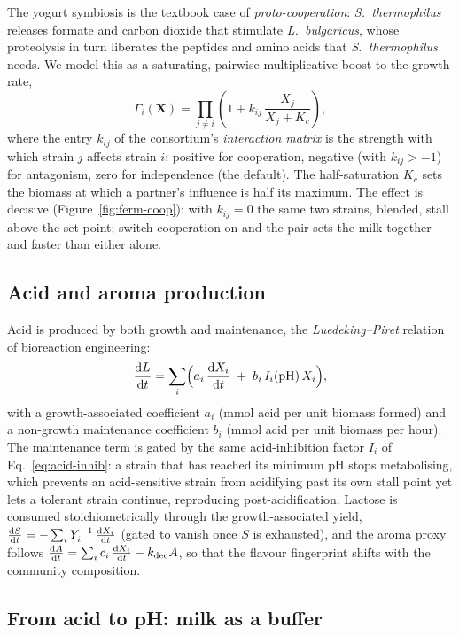 The yogurt symbiosis is the textbook case of \emph{proto-cooperation}: \emph{S.\
thermophilus} releases formate and carbon dioxide that stimulate \emph{L.\
bulgaricus}, whose proteolysis in turn liberates the peptides and amino acids that
\emph{S.\ thermophilus} needs. We model this as a saturating, pairwise
multiplicative boost to the growth rate,
%
\begin{equation}
\Gamma_i(\bm X) = \prod_{j\neq i}
\left(1 + k_{ij}\,\frac{X_j}{X_j+K_c}\right),
\label{eq:interaction}
\end{equation}
%
where the entry $k_{ij}$ of the consortium's \emph{interaction matrix} is the
strength with which strain $j$ affects strain $i$: positive for cooperation,
negative (with $k_{ij}>-1$) for antagonism, zero for independence (the default).
The half-saturation $K_c$ sets the biomass at which a partner's influence is half
its maximum. The effect is decisive (Figure~\ref{fig:ferm-coop}): with
$k_{ij}=0$ the same two strains, blended, stall above the set point; switch
cooperation on and the pair sets the milk together and faster than either alone.

\subsection{Acid and aroma production}

Acid is produced by both growth and maintenance, the \emph{Luedeking--Piret}
relation~\cite{luedeking} of bioreaction engineering:
%
\begin{equation}
\frac{\mathrm{d} L}{\mathrm{d} t} =
\sum_i \Bigl( a_i\,\frac{\mathrm{d} X_i}{\mathrm{d} t} \;+\; b_i\,I_i(\mathrm{pH})\,X_i \Bigr),
\label{eq:luedeking}
\end{equation}
%
with a growth-associated coefficient $a_i$ (mmol acid per unit biomass formed) and
a non-growth maintenance coefficient $b_i$ (mmol acid per unit biomass per hour).
The maintenance term is gated by the same acid-inhibition factor
$I_i$ of Eq.~\eqref{eq:acid-inhib}: a strain that has reached its minimum pH stops
metabolising, which prevents an acid-sensitive strain from acidifying past its own
stall point yet lets a tolerant strain continue, reproducing post-acidification.
Lactose is consumed stoichiometrically through the growth-associated yield,
$\frac{\mathrm{d} S}{\mathrm{d} t} = -\sum_i Y_i^{-1}\,\frac{\mathrm{d} X_i}{\mathrm{d} t}$ (gated to vanish once $S$ is
exhausted), and the aroma proxy follows $\frac{\mathrm{d} A}{\mathrm{d} t} = \sum_i c_i\,\frac{\mathrm{d} X_i}{\mathrm{d} t} -
k_{\mathrm{dec}}A$, so that the flavour fingerprint shifts with the community
composition.

\subsection{From acid to pH: milk as a buffer}
\label{sec:ferm-ph}

